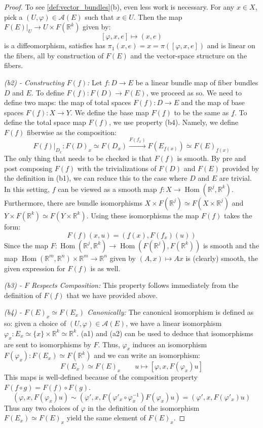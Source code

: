 \documentclass[12pt]{article}
\theoremstyle{definition}
\numberwithin{equation}{section}
\newcommand{\R}{{\mathbb R}}
\newcommand{\op}{\operatorname}
\begin{document}
\begin{proof}
To see \ref{def:vector_bundles}(b), even less work is necessary. For any $x \in X$, pick a $(U,\varphi) \in \mathcal{A}(E)$ such that $x \in U$. Then the map $F(E)|_U \to U \times F(\R^k)$ given by:
\[
[\varphi,x,e] \mapsto (x,e)
\]
is a diffeomorphism, satisfies has $\pi_1(x,e) = x = \pi([\varphi,x,e])$ and is linear on the fibers, all by construction of $F(E)$ and the vector-space structure on the fibers. 

\vspace{5pt}

\emph{(b2) - Constructing $F(f)$:} Let $f:D \to E$ be a linear bundle map of fiber bundles $D$ and $E$. To define $F(f):F(D) \to F(E)$, we proceed as so. We need to define two maps: the map of total spaces $F(f):D \to E$ and the map of base spaces $F(\underline{f}):X \to Y$. We define the base map $F(\underline{f})$ to be the same as $\underline{f}$. To define the total space map $F(f)$, we use property (b4). Namely, we define $F(f)$ fiberwise as the composition:
\[
F(f)|_{D_x}:F(D)_x \simeq F(D_x) \xrightarrow{F(f_x)} F(E_{\underline{f}(x)}) \simeq F(E)_{\underline{f}(x)}
\]
The only thing that needs to be checked is that $F(f)$ is smooth. By pre and post composing $F(f)$ with the trivializations of $F(D)$ and $F(E)$ provided by the definition in (b1), we can reduce this to the case where $D$ and $E$ are trivial. In this setting, $f$ can be viewed as a smooth map $f:X \to \op{Hom}(\R^j,\R^k)$. Furthermore, there are bundle isomorphisms $X \times F(\R^j) \simeq F(X \times \R^j)$ and $Y \times F(\R^k) \simeq F(Y \times \R^k)$. Using these isomorphisms the map $F(f)$ takes the form:
\[
F(f)(x,u) = (\underline{f}(x),F(f_x)(u))
\]
Since the map $F:\op{Hom}(\R^j,\R^k) \to \op{Hom}(F(\R^j),F(\R^k))$ is smooth and the map $\op{Hom}(\R^m,\R^n) \times \R^m \to \R^n$ given by $(A,x) \mapsto Ax$ is (clearly) smooth, the given expression for $F(f)$ is as well.


\vspace{5pt}

\emph{(b3) - $F$ Respects Composition:} This property follows immediately from the definition of $F(f)$ that we have provided above.

\vspace{5pt}

\emph{(b4) - $F(E)_x \simeq F(E_x)$ Canonically:} The canonical isomorphism is defined as so: given a choice of $(U,\varphi) \in \mathcal{A}(E)$, we have a linear isomorphism $\varphi_x:E_x \simeq \{x\} \times \R^k \simeq \R^k$. (a1) and (a2) can be used to deduce that isomorphisms are sent to isomorphisms by $F$. Thus, $\varphi_x$ induces an isomorphism $F(\varphi_x):F(E_x) \simeq F(\R^k)$ and we can write an isomorphism:
\[
F(E_x) \simeq F(E)_x \qquad u \mapsto [\varphi,x,F(\varphi_x)u]
\]
This maps is well-defined because of the composition property $F(f \circ g) = F(f) \circ F(g)$.
\[
(\varphi,x,F(\varphi_x)u) \sim (\varphi',x,F(\varphi'_x \circ \varphi_x^{-1})F(\varphi_x)u) = (\varphi',x,F(\varphi'_x)u)
\]
Thus any two choices of $\varphi$ in the definition of the isomorphism $F(E_x) \simeq F(E)_x$ yield the same element of $F(E)_x$.
\end{proof}
\end{document}

